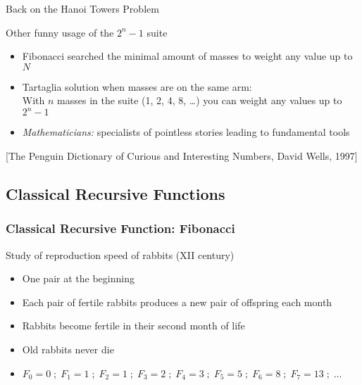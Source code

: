 \begin{Coupe}
\begin{frame}{Back on the Hanoi Towers Problem}
  \begin{block}{Other funny usage of the $2^n-1$ suite}
    \begin{itemize}
    \item Fibonacci searched the minimal amount of masses to weight any value up
      to $N$
    \item Tartaglia solution when masses are on the same arm:\\
      {\small With $n$ masses in the suite (1, 2, 4, 8, \ldots) you can weight any
        values up to $2^n-1$}
    \item \textit{Mathematicians:} specialists of pointless stories leading
      to fundamental tools 
    \end{itemize}
  \end{block}
  
  \vspace{-.5\baselineskip}
  [The Penguin Dictionary of Curious and Interesting Numbers, David Wells, 1997]

\end{frame}
\subsection{Classical Recursive Functions}
\subsectionpage
\begin{frame}[fragile]\frametitle{Classical Recursive Function: Fibonacci}

  \begin{block}{Study of reproduction speed of rabbits (XII century)}
    \begin{itemize}
    \item One pair at the beginning
    \item Each pair of fertile rabbits produces a new pair of offspring each
      month
    \item Rabbits become fertile in their second month of life
    \item Old rabbits never die
    \item $F_0=0 \;;\; F_1=1 \;;\; F_2=1 \;;\; F_3=2  \;;\; F_4=3 \;;\;
           F_5=5 \;;\; F_6=8 \;;\; F_7=13 \;;\; \ldots$
    \end{itemize}
  \end{block}

  \begin{columns}
\end{columns}
\end{frame}
\end{Coupe}
